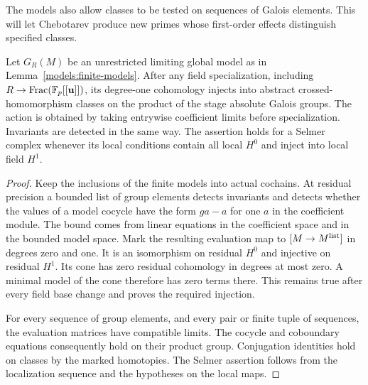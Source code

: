 The models also allow classes to be tested on sequences of Galois
elements.  This will let Chebotarev produce new primes whose
first-order effects distinguish specified classes.

\begin{lemma}\label{models:evaluations}
Let $G_R(M)$ be an unrestricted limiting global model as in
Lemma~\ref{models:finite-models}.  After any field specialization,
including $R\to\operatorname{Frac}(\mathbb F_p[[\mathbf u]])$, its degree-one cohomology
injects into abstract crossed-homomorphism classes on the product of
the stage absolute Galois groups.  The action is obtained by taking
entrywise coefficient limits before specialization.  Invariants are
detected in the same way.  The assertion holds for a Selmer complex
whenever its local conditions contain all local $H^0$ and inject into
local field $H^1$.
\end{lemma}

\begin{proof}
Keep the inclusions of the finite models into actual cochains.  At
residual precision a bounded list of group elements detects
invariants and detects whether the values of a model cocycle have
the form $g a-a$ for one $a$ in the coefficient module.  The bound
comes from linear equations in the coefficient space and in the
bounded model space.  Mark the resulting evaluation map to
$[M\to M^{\rm list}]$ in degrees zero and one.  It is an isomorphism
on residual $H^0$ and injective on residual $H^1$.  Its cone has zero
residual cohomology in degrees at most zero.  A minimal model of the
cone therefore has zero terms there.  This remains true after every
field base change and proves the required injection.

For every sequence of group elements, and every pair or finite tuple
of sequences, the evaluation matrices have compatible limits.
The cocycle and coboundary equations consequently hold on their
product group.  Conjugation identities hold on classes by the marked
homotopies.  The Selmer assertion follows from the localization
sequence and the hypotheses on the local maps.
\end{proof}

